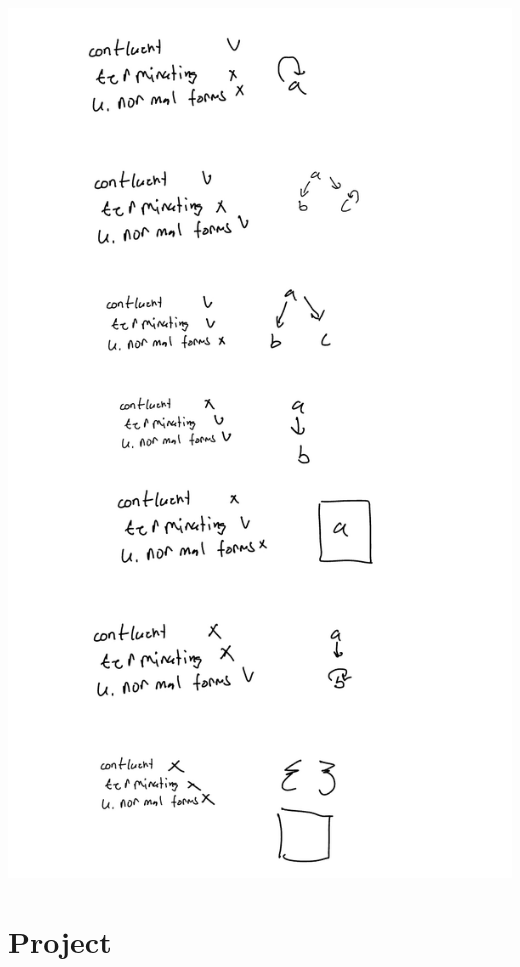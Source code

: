 \documentclass{article}
\theoremstyle{theorem}
\theoremstyle{definition}
\theoremstyle{remark}
\begin{document}
\includegraphics[scale=0.2]{hw6.jpg}


\section{Project}\label{Project}
\end{document}
